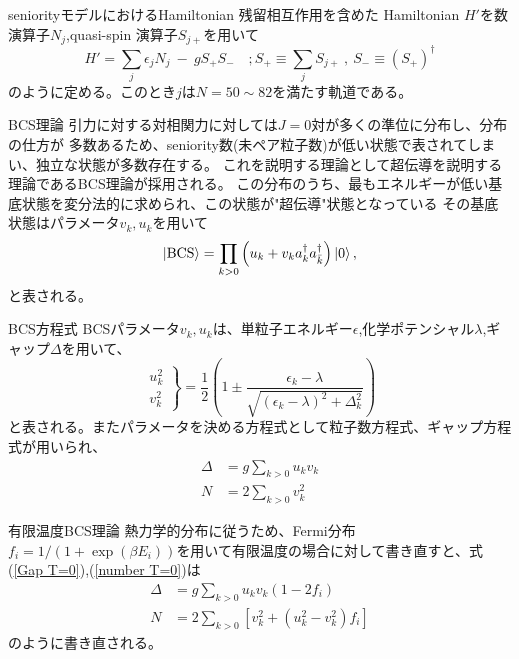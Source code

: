 \documentclass[aspectratio=169, 12pt, dvipdfmx]{beamer}
\begin{document}
\begin{frame}{seniorityモデルにおけるHamiltonian}
  残留相互作用を含めた
  Hamiltonian  $H'$を数演算子$N_j$,quasi-spin 演算子$S_{j+}$を用いて
  \begin{equation}
    H' = \sum_j \epsilon_j N_j\ -\ gS_{+} S_{-}\quad;S_{+} \equiv \sum_j S_{j+}\ ,\ S_{-} \equiv (S_{+})^\dagger
  \end{equation}
  のように定める。このとき$j$は$N=50\sim 82$を満たす軌道である。
\end{frame}


\begin{frame}{BCS理論}
  引力に対する対相関力に対しては$J=0$対が多くの準位に分布し、分布の仕方が
  多数あるため、seniority数(未ペア粒子数)が低い状態で表されてしまい、独立な状態が多数存在する。
  これを説明する理論として超伝導を説明する理論であるBCS理論が採用される。
  \cite{asakura_structure}
  この分布のうち、最もエネルギーが低い基底状態を変分法的に求められ、この状態が"超伝導"状態となっている
  その基底状態はパラメータ$v_k,u_k$を用いて
  \begin{equation}
    \ket{\text{BCS}}=\prod_{k>0}\left(u_k + v_k a^{\dagger}_{k}a^{\dagger}_{\bar{k}}\right)\ket{0},
  \end{equation}
  と表される。
\end{frame}

\begin{frame}{BCS方程式}
  BCSパラメータ$v_k,u_k$は、単粒子エネルギー$\epsilon$,化学ポテンシャル$\lambda$,ギャップ$\Delta$を用いて、\cite{thenuclearmanybody}
  \begin{equation}
    \left. 
      \begin{aligned}
        u_k^2\\
        v_k^2
      \end{aligned}
    \right\}
    =\dfrac{1}{2}\left(1\pm\dfrac{\epsilon_k -\lambda}{\sqrt{(\epsilon_k -\lambda)^2+\Delta_k^2}}\right)
  \end{equation}
  と表される。またパラメータを決める方程式として粒子数方程式、ギャップ方程式が用いられ、
  \begin{align}
    \Delta  &=  g\sum_{k>0}u_k v_k\label{Gap T=0}\\
    N       &=  2\sum_{k>0}v_k^2\label{number T=0}
  \end{align}
\end{frame}

\begin{frame}{有限温度BCS理論}
  熱力学的分布に従うため、Fermi分布$f_i=1/(1+\exp(\beta E_i))$を用いて有限温度の場合に対して書き直すと、式(\ref{Gap T=0}),(\ref{number T=0})は
  \begin{align}
    \Delta  &=  g\sum_{k>0}u_k v_k(1-2f_i)\label{Gap FT}\\
    N       &=  2\sum_{k>0}\left[v_k^2+(u_k^2 - v_k^2)f_i\right]\label{number FT} 
  \end{align}
  のように書き直される。
\end{frame}
\end{document}
